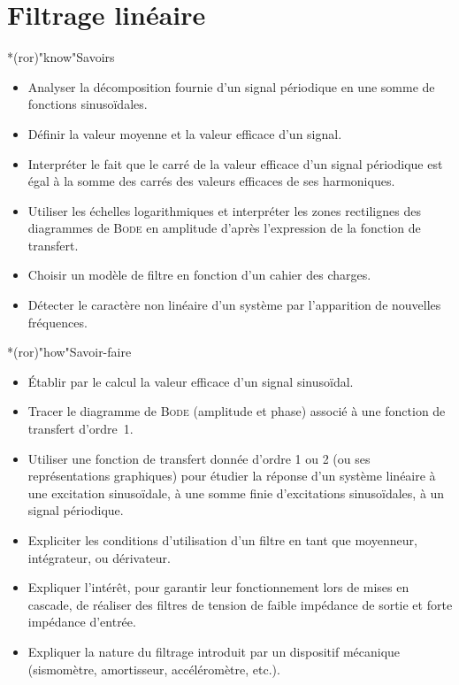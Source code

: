 \documentclass[../../main/main.tex]{subfiles}
\begin{document}
\setcounter{chapter}{6}

\chapter{Filtrage lin\'eaire}

\vfill

\begin{prgm}
	\begin{tcb}*(ror)"know"{Savoirs}
		\begin{itemize}[label=$\diamond$, leftmargin=10pt]
			\item Analyser la décomposition fournie d'un signal périodique en une
			      somme de fonctions sinusoïdales.
			\item Définir la valeur moyenne et la valeur efficace d'un signal.
			\item Interpréter le fait que le carré de la valeur efficace d'un signal
			      périodique est égal à la somme des carrés des valeurs efficaces de
			      ses harmoniques.
			\item Utiliser les échelles logarithmiques et interpréter les zones
			      rectilignes des diagrammes de \textsc{Bode} en amplitude d'après
			      l'expression de la fonction de transfert.
			\item Choisir un modèle de filtre en fonction d'un cahier des charges.
			\item Détecter le caractère non linéaire d'un système par l'apparition de
			      nouvelles fréquences.
		\end{itemize}
	\end{tcb}
	\begin{tcb}*(ror)"how"{Savoir-faire}
		\begin{itemize}[label=$\diamond$, leftmargin=10pt]
			\item Établir par le calcul la valeur efficace d'un signal sinusoïdal.
			\item Tracer le diagramme de \textsc{Bode} (amplitude et phase)
			      associé à une fonction de transfert d'ordre~1.
			\item Utiliser une fonction de transfert donnée d'ordre 1 ou 2 (ou ses
			      représentations graphiques) pour étudier la réponse d'un système
			      linéaire à une excitation sinusoïdale, à une somme finie
			      d'excitations sinusoïdales, à un signal périodique.
			\item Expliciter les conditions d'utilisation d'un filtre en tant que
			      moyenneur, intégrateur, ou dérivateur.
			\item Expliquer l'intérêt, pour garantir leur fonctionnement lors de mises
			      en cascade, de réaliser des filtres de tension de faible impédance
			      de sortie et forte impédance d'entrée.
			\item Expliquer la nature du filtrage introduit par un dispositif
			      mécanique (sismomètre, amortisseur, accéléromètre, etc.).
		\end{itemize}
	\end{tcb}
\end{prgm}
\end{document}
